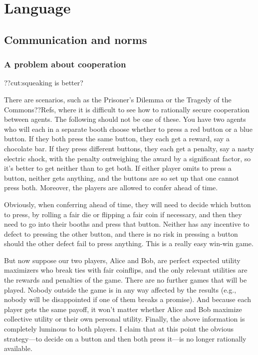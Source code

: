 \def\mychapter{VII}

\chapter{Language}\label{ch:semantics}
\section{Communication and norms}
\subsection{A problem about cooperation}
??cut:squeaking is better?

There are scenarios, such as the Prisoner's Dilemma or the Tragedy of the Commons??Refs, where it is difficult 
to see how to rationally secure cooperation between agents. The following should not be one of these. You have
two agents who will each in a separate booth choose whether to press a red button or a blue button. If they both
press the same button, they each get a reward, say a chocolate bar. If they press different buttons, they 
each get a penalty, say a nasty electric shock, with the penalty outweighing the award by a significant factor, so it's better 
to get neither than to get both. If either player omits to press a button, neither gets anything, and the buttons are so 
set up that one cannot press both. Moreover, the players are allowed to confer ahead of time.

Obviously, when conferring ahead of time, they will need to decide which button to press, by rolling a fair die or
flipping a fair coin if
necessary, and then they need to go into their booths and press that button. Neither has any incentive to defect
to pressing the other button, and there is no risk in pressing a button should the other defect fail to press
anything. This is a really easy win-win game. 

But now suppose our two players, Alice and Bob, are perfect expected utility maximizers who break ties with fair coinflips, 
and the only relevant utilities are the  rewards and penalties of the game. There are no further games that 
will be played. Nobody outside the game is in any way affected by the results (e.g., nobody will be disappointed 
if one of them breaks a promise). And because each player gets the same payoff, it won't matter whether Alice and Bob
maximize collective utility or their own personal utility. Finally, the above information is completely luminous to 
both players. I claim that at this point the obvious strategy---to decide on a button and then both press it---is no 
longer rationally available.

